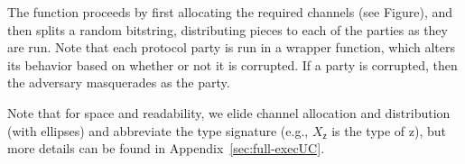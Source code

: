 

The function proceeds by first allocating the required channels (see Figure),
and then splits a random bitstring, distributing pieces to each of the parties
as they are run.  Note that each protocol party is run in a \textsf{wrapper}
function, which alters its behavior based on whether or not it is corrupted. If
a party is corrupted, then the adversary masquerades as the party.

Note that for space and readability, we elide channel allocation
and distribution (with ellipses) and abbreviate the type signature (e.g.,
$X_{\mathsf{z}}$ is the type of \textsf{z}), but more details can be found
in Appendix~\ref{sec:full-execUC}.

